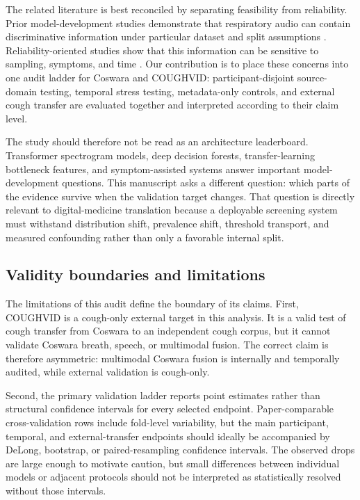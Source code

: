 \documentclass[11pt]{article}
\begin{document}
The related literature is best reconciled by separating feasibility from reliability. Prior model-development studies demonstrate that respiratory audio can contain discriminative information under particular dataset and split assumptions \citep{pahar2021global,pahar2022transfer,chowdhury2022mcdm,aytekin2024hst,islam2026dndf}. Reliability-oriented studies show that this information can be sensitive to sampling, symptoms, and time \citep{han2022sounds,coppock2024audio,ganitidis2025jmir}. Our contribution is to place these concerns into one audit ladder for Coswara and COUGHVID: participant-disjoint source-domain testing, temporal stress testing, metadata-only controls, and external cough transfer are evaluated together and interpreted according to their claim level.

The study should therefore not be read as an architecture leaderboard. Transformer spectrogram models, deep decision forests, transfer-learning bottleneck features, and symptom-assisted systems answer important model-development questions. This manuscript asks a different question: which parts of the evidence survive when the validation target changes. That question is directly relevant to digital-medicine translation because a deployable screening system must withstand distribution shift, prevalence shift, threshold transport, and measured confounding rather than only a favorable internal split.

\subsection*{Validity boundaries and limitations}

The limitations of this audit define the boundary of its claims. First, COUGHVID is a cough-only external target in this analysis. It is a valid test of cough transfer from Coswara to an independent cough corpus, but it cannot validate Coswara breath, speech, or multimodal fusion. The correct claim is therefore asymmetric: multimodal Coswara fusion is internally and temporally audited, while external validation is cough-only.

Second, the primary validation ladder reports point estimates rather than structural confidence intervals for every selected endpoint. Paper-comparable cross-validation rows include fold-level variability, but the main participant, temporal, and external-transfer endpoints should ideally be accompanied by DeLong, bootstrap, or paired-resampling confidence intervals. The observed drops are large enough to motivate caution, but small differences between individual models or adjacent protocols should not be interpreted as statistically resolved without those intervals.
\end{document}

